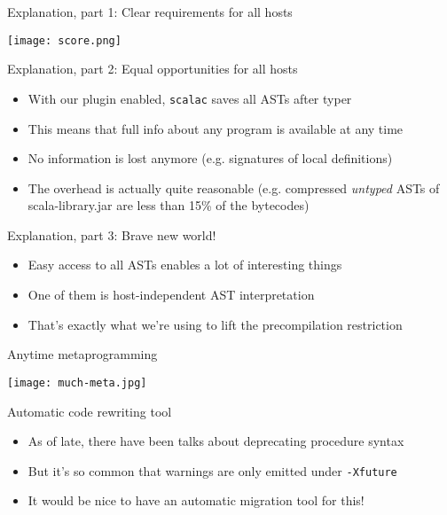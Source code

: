 \documentclass[svgnames,dvipsnames,hyperref={bookmarks=false},usepdftitle=false]{beamer}
\begin{document}
\begin{frame}[c, fragile]{Explanation, part 1: Clear requirements for all hosts}
\begin{center}
\texttt{[image: score.png]}
\end{center}
\end{frame}

\begin{frame}{Explanation, part 2: Equal opportunities for all hosts}
\begin{itemize}
\item With our plugin enabled, \texttt{scalac} saves all ASTs after typer
\item This means that full info about any program is available at any time
\item No information is lost anymore (e.g. signatures of local definitions)
\item The overhead is actually quite reasonable (e.g. compressed \emph{untyped} ASTs of scala-library.jar are less than 15\% of the bytecodes)
\end{itemize}
\end{frame}

\begin{frame}{Explanation, part 3: Brave new world!}
\begin{itemize}
\item Easy access to all ASTs enables a lot of interesting things
\item One of them is host-independent AST interpretation
\item That's exactly what we're using to lift the precompilation restriction
\end{itemize}
\end{frame}

\begin{frame}[c, fragile]{Anytime metaprogramming}
\begin{center}
\texttt{[image: much-meta.jpg]}
\end{center}
\end{frame}

\begin{frame}{Automatic code rewriting tool}
\begin{itemize}
\item As of late, there have been talks about deprecating procedure syntax
\item But it's so common that warnings are only emitted under \texttt{-Xfuture}
\item It would be nice to have an automatic migration tool for this!
\end{itemize}
\end{frame}
\end{document}
